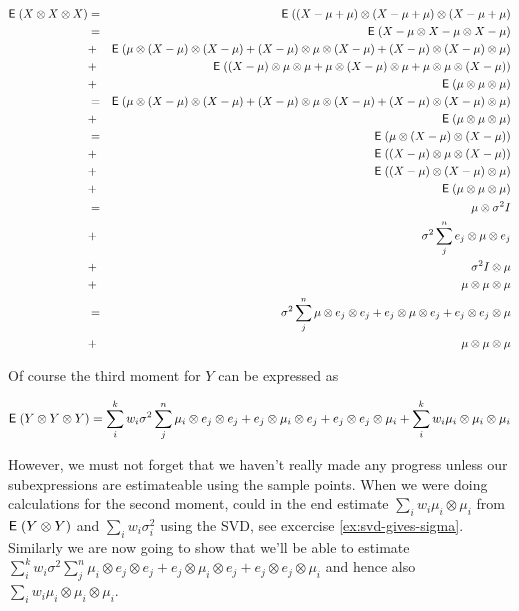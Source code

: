 \documentclass{book}
\numberwithin{exercise}{chapter}
\begin{document}

\newcommand{\tensor}[3]{
  \ensuremath{#1 \otimes #2 \otimes #3}
}

\newcommand{\tensorsame}[1]{
  \tensor{#1}{#1}{#1}
}

\newcommand{\perms}[2]{
  \tensor{#1}{#2}{#2} +
  \tensor{#2}{#1}{#2} +
  \tensor{#2}{#2}{#1}
}

\begin{eqnarray*}
  \E(X \otimes X \otimes X)
  &=& \E((X - \mu + \mu) \otimes (X - \mu + \mu) \otimes (X - \mu + \mu) \\
  &=& \E(\tensorsame{X - \mu}) \\
  &+& \E(\perms{\mu}{(X - \mu)}) \\
  &+& \E(\perms{(X - \mu)}{\mu}) \\
  &+& \E(\tensorsame{\mu}) \\
  &=& \E(\perms{\mu}{(X - \mu)}) \\
  &+& \E(\tensorsame{\mu}) \\
  &=& \E(\tensor{\mu}{(X - \mu)}{(X - \mu)}) \\
  &+& \E(\tensor{(X - \mu)}{\mu}{(X - \mu)}) \\
  &+& \E(\tensor{(X - \mu)}{(X - \mu)}{\mu}) \\
  &+& \E(\tensorsame{\mu}) \\
  &=& \mu \otimes \sigma^2 I \\
  &+& \sigma^2 \sum_j^n \tensor{e_j}{\mu}{e_j} \\
  &+& \sigma^2 I \otimes \mu \\
  &+& \tensorsame{\mu} \\
  &=& \sigma^2 \sum_j^n \perms{\mu}{e_j} \\
  &+& \tensorsame{\mu} \\
\end{eqnarray*}

Of course the third moment for $Y$ can be expressed as

\[
  \E(Y \otimes Y \otimes Y) =
  \sum_i^k w_i \sigma^2 \sum_j^n \perms{\mu_i}{e_j} + \sum_i^k w_i \tensorsame{\mu_i}
\]

However, we must not forget that we haven't really made any progress
unless our subexpressions are estimateable using the sample points. When
we were doing calculations for the second moment, could in the end
estimate $\sum_i w_i \mu_i \otimes \mu_i$ from $\hbox{{\sf E}\;}(Y \otimes Y)$ and
$\sum_i w_i \sigma_i^2$ using the SVD, see excercise
\ref{ex:svd-gives-sigma}. Similarly we are now going to show that we'll
be able to estimate $\sum_i^k w_i \sigma^2 \sum_j^n \perms{\mu_i}{e_j}$
and hence also $\sum_i w_i \tensorsame{\mu_i}$.
\end{document}
